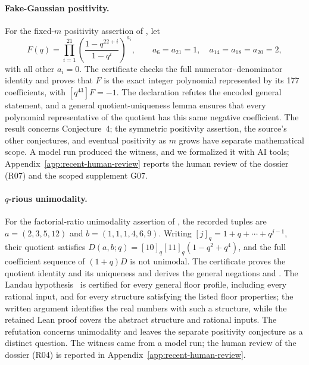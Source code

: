 \paragraph{Fake-Gaussian positivity.}
For the fixed-$m$ positivity assertion of \citet{gatzweilerkrattenthaler2025positivity}, let
\[
 F(q)=\prod_{i=1}^{21}\left(\frac{1-q^{22+i}}{1-q^i}\right)^{a_i},
 \qquad a_6=a_{21}=1,\quad a_{14}=a_{18}=a_{20}=2,
\]
with all other $a_i=0$. The certificate  checks the full numerator--denominator identity and proves that $F$ is the exact integer polynomial represented by its 177 coefficients, with $[q^{43}]F=-1$. The declaration  refutes the encoded general statement, and a general quotient-uniqueness lemma ensures that every polynomial representative of the quotient has this same negative coefficient. The result concerns Conjecture~4; the symmetric positivity assertion, the source's other conjectures, and eventual positivity as $m$ grows have separate mathematical scope. A model run produced the witness, and we formalized it with AI tools; Appendix~\ref{app:recent-human-review} reports the human review of the dossier (R07) and the scoped supplement G07.

\paragraph{$q$-rious unimodality.}
For the factorial-ratio unimodality assertion of \citet{warnaarzudilin2025qrious}, the recorded tuples are $a=(2,3,5,12)$ and $b=(1,1,1,4,6,9)$. Writing $[j]_q=1+q+\cdots+q^{j-1}$, their quotient satisfies $D(a,b;q)=[10]_q[11]_q(1-q^2+q^4)$, and the full coefficient sequence of $(1+q)D$ is not unimodal. The certificate  proves the quotient identity and its uniqueness and derives the general negations  and . The Landau hypothesis~\citep[Eq.~(1)]{warnaarzudilin2025qrious} is certified for every general floor profile, including every rational input, and for every structure satisfying the listed floor properties; the written argument identifies the real numbers with such a structure, while the retained Lean proof covers the abstract structure and rational inputs. The refutation concerns unimodality and leaves the separate positivity conjecture as a distinct question. The witness came from a model run; the human review of the dossier (R04) is reported in Appendix~\ref{app:recent-human-review}.

